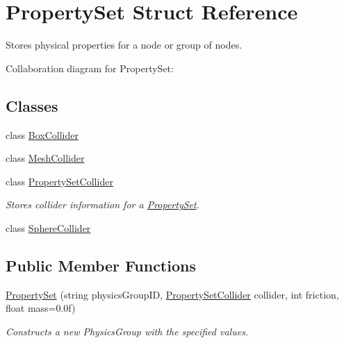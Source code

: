 \hypertarget{struct_property_set}{}\section{Property\+Set Struct Reference}
\label{struct_property_set}


Stores physical properties for a node or group of nodes.  




Collaboration diagram for Property\+Set\+:
\subsection*{Classes}
\begin{DoxyCompactItemize}
\item 
class \hyperlink{class_property_set_1_1_box_collider}{Box\+Collider}
\item 
class \hyperlink{class_property_set_1_1_mesh_collider}{Mesh\+Collider}
\item 
class \hyperlink{class_property_set_1_1_property_set_collider}{Property\+Set\+Collider}
\begin{DoxyCompactList}\small\item\em Stores collider information for a \hyperlink{struct_property_set}{Property\+Set}. \end{DoxyCompactList}\item 
class \hyperlink{class_property_set_1_1_sphere_collider}{Sphere\+Collider}
\end{DoxyCompactItemize}
\subsection*{Public Member Functions}
\begin{DoxyCompactItemize}
\item 
\hyperlink{struct_property_set_a428033b47a1de1ccf9bf9ef1d14359ed}{Property\+Set} (string physics\+Group\+ID, \hyperlink{class_property_set_1_1_property_set_collider}{Property\+Set\+Collider} collider, int friction, float mass=0.\+0f)
\begin{DoxyCompactList}\small\item\em Constructs a new Physics\+Group with the specified values. \end{DoxyCompactList}\end{DoxyCompactItemize}
